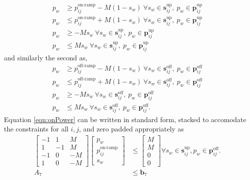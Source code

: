 \begin{equation} \label{eqn:onPower}\begin{aligned}
	p_w &\ge p^{\text{on-ramp}}_{ij} - M(1 - s_w) \ \forall s_w \in \mathbf{s}^{\text{up}}_{ij}, \ p_w \in \mathbf{p}_{ij}^{\text{up}}\\
	p_w &\le p^{\text{on-ramp}}_{ij} + M(1 - s_w) \ \forall s_w \in \mathbf{s}^{\text{up}}_{ij}, \ p_w \in \mathbf{p}_{ij}^{\text{up}}\\
	p_w &\ge -Ms_w \ \forall s_w \in \mathbf{s}^{\text{up}}_{ij}, \ p_w \in \mathbf{p}_{ij}^{\text{up}}\\
	p_w &\le Ms_w \ \forall s_w \in \mathbf{s}^{\text{up}}_{ij}, \ p_w \in \mathbf{p}_{ij}^{\text{up}}
\end{aligned} \end{equation}
and similarly the second as, 
\begin{equation} \label{eqn:offPower} \begin{aligned}
	p_w &\ge p^{\text{off-ramp}}_{ij} - M(1 - s_w) \ \forall s_w \in \mathbf{s}^{\text{off}}_{ij}, \ p_w \in \mathbf{p}_{ij}^{\text{off}}\\
		p_w &\le p^{\text{off-ramp}}_{ij} + M(1 - s_w) \ \forall s_w \in \mathbf{s}^{\text{off}}_{ij}, \ p_w \in \mathbf{p}_{ij}^{\text{off}}\\
		p_w &\ge -Ms_w \ \forall s_w \in \mathbf{s}^{\text{off}}_{ij}, \ p_w \in \mathbf{p}_{ij}^{\text{off}}\\
		p_w &\le Ms_w \ \forall s_w \in \mathbf{s}^{\text{off}}_{ij}, \ p_w \in \mathbf{p}_{ij}^{\text{off}}.
\end{aligned} \end{equation} 
Equation \ref{eqn:onPower} can be written in standard form, stacked to accomodate the constraints for all $i,j$, and zero padded appropriately as
\begin{equation}\begin{aligned} 
	\begin{bmatrix}
		-1 & 1 & M \\
		1  & -1 & M \\
		-1 & 0 & -M \\
		1 & 0 & -M 
	\end{bmatrix}
	\begin{bmatrix} 
		p_w                     \\
	        p_{ij}^{\text{on-ramp}} \\
		s_w
	\end{bmatrix}  &\le
	\begin{bmatrix}
		M \\
		M \\
		0 \\
		0
	\end{bmatrix} \forall s_w \in \mathbf{s}_{ij}^{\text{up}}, p_w \in \mathbf{p}_{ij}^{\text{off}}.\\ 
	A_7 &\le \mathbf{b}_7 
\end{aligned}\end{equation}
